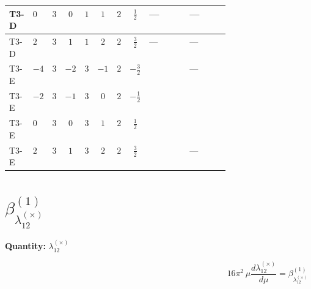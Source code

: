 \documentclass[8pt]{article}
\begin{document}
\begin{landscape}
\begin{longtable}{@{}llcccccc >{\raggedright\arraybackslash}p{0.21\linewidth} >{\raggedright\arraybackslash}p{0.21\linewidth}@{}}
\midrule
T3-D & $0$ & $3$ & $0$ & $1$ & $1$ & $2$ & $\frac{1}{2}$ & --- & --- \\
\midrule
T3-D & $2$ & $3$ & $1$ & $1$ & $2$ & $2$ & $\frac{3}{2}$ & --- & --- \\
\midrule
T3-E & $-4$ & $3$ & $-2$ & $3$ & $-1$ & $2$ & $-\frac{3}{2}$ & \scriptsize\adjustbox{max width=\linewidth}{$\begin{gathered} +3 {\lambda_{HS_1}^{(A)}} {\lambda_{HS_2}^{(A)}}\end{gathered}$} & --- \\
\midrule
T3-E & $-2$ & $3$ & $-1$ & $3$ & $0$ & $2$ & $-\frac{1}{2}$ & \scriptsize\adjustbox{max width=\linewidth}{$\begin{gathered} +3 {\lambda_{HS_1}^{(A)}} {\lambda_{HS_2}^{(A)}}\end{gathered}$} & \scriptsize\adjustbox{max width=\linewidth}{$\begin{gathered} -6 {g_1}^2 {\lambda_{12}^{(A)}}\end{gathered}$} \\
\midrule
T3-E & $0$ & $3$ & $0$ & $3$ & $1$ & $2$ & $\frac{1}{2}$ & \scriptsize\adjustbox{max width=\linewidth}{$\begin{gathered} +3 {\lambda_{HS_1}^{(A)}} {\lambda_{HS_2}^{(A)}}\end{gathered}$} & \scriptsize\adjustbox{max width=\linewidth}{$\begin{gathered} -6 {g_1}^2 {\lambda_{12}^{(A)}}\end{gathered}$} \\
\midrule
T3-E & $2$ & $3$ & $1$ & $3$ & $2$ & $2$ & $\frac{3}{2}$ & \scriptsize\adjustbox{max width=\linewidth}{$\begin{gathered} +3 {\lambda_{HS_1}^{(A)}} {\lambda_{HS_2}^{(A)}}\end{gathered}$} & --- \\
\midrule
\bottomrule
\end{longtable}
\clearpage
\section*{$\beta_{\lambda_{12}^{(\times)}}^{(1)}$}
\noindent\textbf{Quantity: }$\lambda_{12}^{(\times)}$\par\smallskip
\[16\pi^2\,\mu\frac{d \lambda_{12}^{(\times)}}{d\mu}=\beta_{\lambda_{12}^{(\times)}}^{(1)}\]

\end{landscape}
\end{document}
